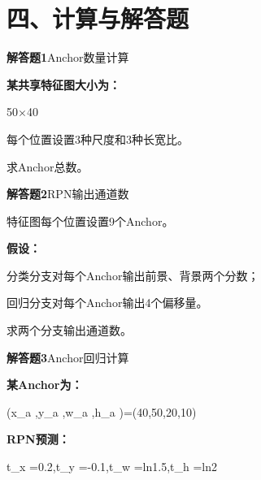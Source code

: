 \documentclass[UTF8,openany,oneside,zihao=-4,fontset=windows]{ctexbook}
\newif\ifshowsolutions
\newcommand{\Question}[2]{%
  \par\Needspace{4\baselineskip}\medskip
  \noindent\textbf{\color{MVBlue}#1}\quad #2\par
}
\newenvironment{AnswerBox}{\begin{tcolorbox}[breakable,colback=MVLight,colframe=MVBlue!45,title={参考答案},fonttitle=\bfseries,boxrule=0.55pt,arc=1.5mm,left=2mm,right=2mm,top=1.5mm,bottom=1.5mm]}{\end{tcolorbox}}
\newcommand{\PracticeSpace}[1]{\ifshowsolutions\else\par\vspace{#1}\par\fi}
\begin{document}
\section{四、计算与解答题}
\Question{解答题1}{Anchor数量计算}
\par\noindent\textbf{某共享特征图大小为：}
\par 50×40
\par 每个位置设置3种尺度和3种长宽比。
\par 求Anchor总数。
\ifshowsolutions
\begin{AnswerBox}
\par\noindent\textbf{每个位置的Anchor数量为：}
\par 3×3=9
\par\noindent\textbf{特征图位置数量为：}
\par 50×40=2000
\par\noindent\textbf{总Anchor数：}
\par 2000×9=18000
\par\noindent\textbf{因此：}
\par 18000
\end{AnswerBox}
\else
\PracticeSpace{4.2cm}
\fi
\Question{解答题2}{RPN输出通道数}
\par 特征图每个位置设置9个Anchor。
\par\noindent\textbf{假设：}
\par\noindent\textbullet\quad 分类分支对每个Anchor输出前景、背景两个分数；
\par 回归分支对每个Anchor输出4个偏移量。
\par 求两个分支输出通道数。
\ifshowsolutions
\begin{AnswerBox}
\par\noindent\textbf{分类分支：}
\par 2×9=18
\par\noindent\textbf{回归分支：}
\par 4×9=36
\par\noindent\textbf{所以：}
\par 分类分支18通道，回归分支36通道
\end{AnswerBox}
\else
\PracticeSpace{4.2cm}
\fi
\Question{解答题3}{Anchor回归计算}
\par\noindent\textbf{某Anchor为：}
\begin{center}\small\ttfamily (x\_a ,y\_a ,w\_a ,h\_a )=(40,50,20,10)\end{center}
\par\noindent\textbf{RPN预测：}
\begin{center}\small\ttfamily t\_x =0.2,t\_y =-0.1,t\_w =ln1.5,t\_h =ln2\end{center}
\end{document}
